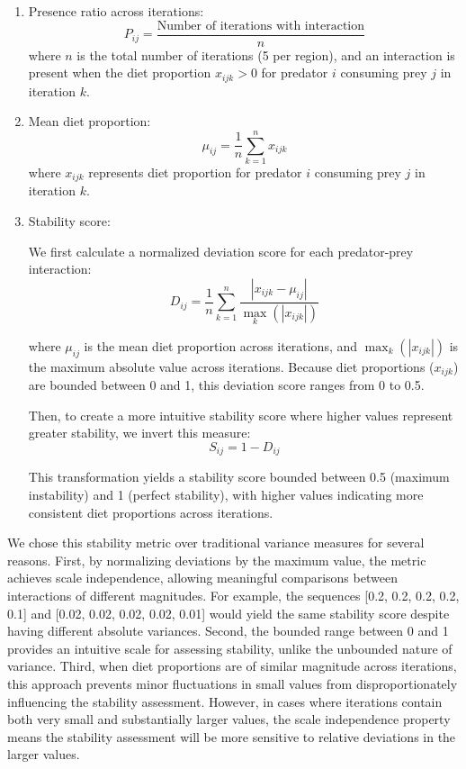 \begin{enumerate}
    \item Presence ratio across iterations:
    \[
    P_{ij} = \frac{\text{Number of iterations with interaction}}{n}
    \]
    where $n$ is the total number of iterations (5 per region), and an interaction is present when the diet proportion $x_{ijk} > 0$ for predator $i$ consuming prey $j$ in iteration $k$.

    \item Mean diet proportion:
    \[
    \mu_{ij} = \frac{1}{n}\sum_{k=1}^{n} x_{ijk}
    \]
    where $x_{ijk}$ represents diet proportion for predator $i$ consuming prey $j$ in iteration $k$.

    \item Stability score:
    
    We first calculate a normalized deviation score for each predator-prey interaction:
    \[
    D_{ij} = \frac{1}{n}\sum_{k=1}^{n} \frac{|x_{ijk} - \mu_{ij}|}{\max_{k}(|x_{ijk}|)}
    \]
    
    where $\mu_{ij}$ is the mean diet proportion across iterations, and $\max_{k}(|x_{ijk}|)$ is the maximum absolute value across iterations. Because diet proportions ($x_{ijk}$) are bounded between 0 and 1, this deviation score ranges from 0 to 0.5.
    
    Then, to create a more intuitive stability score where higher values represent greater stability, we invert this measure:
    \[
    S_{ij} = 1 - D_{ij}
    \]
    
    This transformation yields a stability score bounded between 0.5 (maximum instability) and 1 (perfect stability), with higher values indicating more consistent diet proportions across iterations.
\end{enumerate}

We chose this stability metric over traditional variance measures for several reasons. First, by normalizing deviations by the maximum value, the metric achieves scale independence, allowing meaningful comparisons between interactions of different magnitudes. For example, the sequences [0.2, 0.2, 0.2, 0.2, 0.1] and [0.02, 0.02, 0.02, 0.02, 0.01] would yield the same stability score despite having different absolute variances. Second, the bounded range between 0 and 1 provides an intuitive scale for assessing stability, unlike the unbounded nature of variance. Third, when diet proportions are of similar magnitude across iterations, this approach prevents minor fluctuations in small values from disproportionately influencing the stability assessment. However, in cases where iterations contain both very small and substantially larger values, the scale independence property means the stability assessment will be more sensitive to relative deviations in the larger values.

